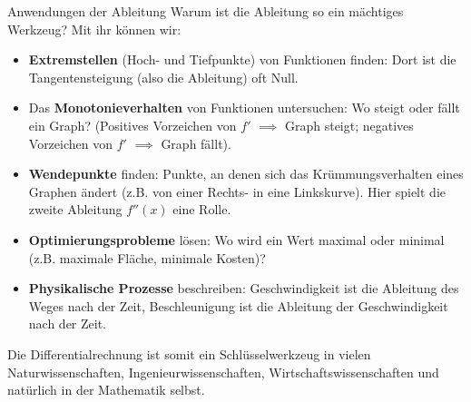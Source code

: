 \begin{warumwichtigumgebung}{Anwendungen der Ableitung}
Warum ist die Ableitung so ein mächtiges Werkzeug? Mit ihr können wir:
\begin{itemize}
    \item \textbf{Extremstellen} (Hoch- und Tiefpunkte) von Funktionen finden: Dort ist die Tangentensteigung (also die Ableitung) oft Null.
    \item Das \textbf{Monotonieverhalten} von Funktionen untersuchen: Wo steigt oder fällt ein Graph? (Positives Vorzeichen von $f'$ $\implies$ Graph steigt; negatives Vorzeichen von $f'$ $\implies$ Graph fällt).
    \item \textbf{Wendepunkte} finden: Punkte, an denen sich das Krümmungsverhalten eines Graphen ändert (z.B. von einer Rechts- in eine Linkskurve). Hier spielt die zweite Ableitung $f''(x)$ eine Rolle.
    \item \textbf{Optimierungsprobleme} lösen: Wo wird ein Wert maximal oder minimal (z.B. maximale Fläche, minimale Kosten)?
    \item \textbf{Physikalische Prozesse} beschreiben: Geschwindigkeit ist die Ableitung des Weges nach der Zeit, Beschleunigung ist die Ableitung der Geschwindigkeit nach der Zeit.
\end{itemize}
Die Differentialrechnung ist somit ein Schlüsselwerkzeug in vielen Naturwissenschaften, Ingenieurwissenschaften, Wirtschaftswissenschaften und natürlich in der Mathematik selbst.
\end{warumwichtigumgebung}


